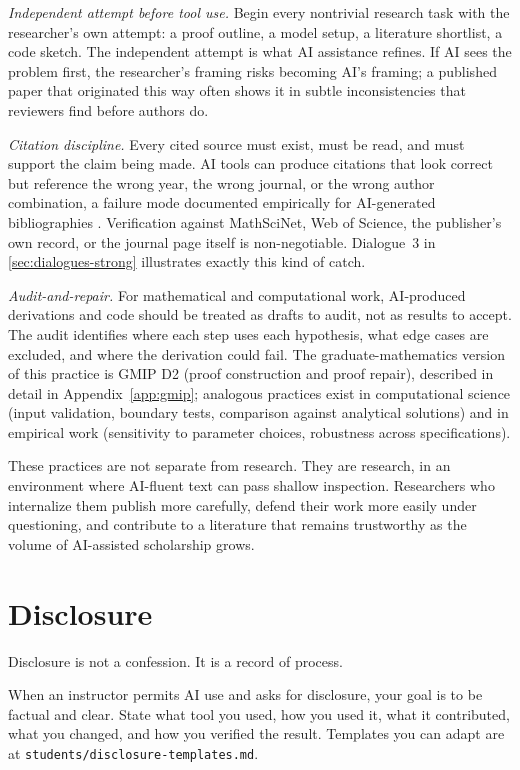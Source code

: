 \documentclass{SIAMbook2023}
\begin{document}
\textit{Independent attempt before tool use.} Begin every nontrivial research task with the researcher's own attempt: a proof outline, a model setup, a literature shortlist, a code sketch. The independent attempt is what AI assistance refines. If AI sees the problem first, the researcher's framing risks becoming AI's framing; a published paper that originated this way often shows it in subtle inconsistencies that reviewers find before authors do.

\textit{Citation discipline.} Every cited source must exist, must be read, and must support the claim being made. AI tools can produce citations that look correct but reference the wrong year, the wrong journal, or the wrong author combination, a failure mode documented empirically for AI-generated bibliographies \citep{walters2023fabrication}. Verification against MathSciNet, Web of Science, the publisher's own record, or the journal page itself is non-negotiable. Dialogue~3 in \cref{sec:dialogues-strong} illustrates exactly this kind of catch.

\textit{Audit-and-repair.} For mathematical and computational work, AI-produced derivations and code should be treated as drafts to audit, not as results to accept. The audit identifies where each step uses each hypothesis, what edge cases are excluded, and where the derivation could fail. The graduate-mathematics version of this practice is GMIP D2 (proof construction and proof repair), described in detail in Appendix~\ref{app:gmip}; analogous practices exist in computational science (input validation, boundary tests, comparison against analytical solutions) and in empirical work (sensitivity to parameter choices, robustness across specifications).

These practices are not separate from research. They are research, in an environment where AI-fluent text can pass shallow inspection. Researchers who internalize them publish more carefully, defend their work more easily under questioning, and contribute to a literature that remains trustworthy as the volume of AI-assisted scholarship grows.

\section{Disclosure}
\label{sec:disclosure}%

Disclosure is not a confession. It is a record of process.

When an instructor permits AI use and asks for disclosure, your goal is to be factual and clear. State what tool you used, how you used it, what it contributed, what you changed, and how you verified the result. Templates you can adapt are at \texttt{students/disclosure-templates.md}.
\end{document}
